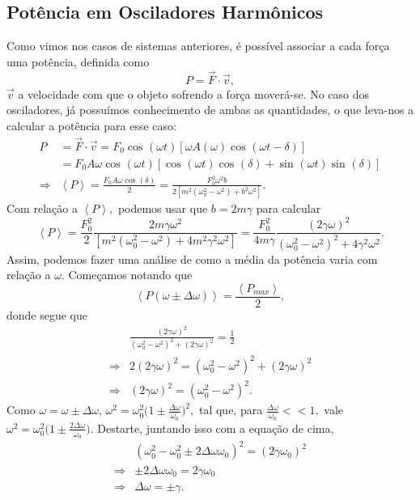 \documentclass{article}
\begin{document}
\subsection{Potência em Osciladores Harmônicos}
  Como vimos nos casos de sistemas anteriores, é possível associar a cada força uma potência, definida como 
    \[
      P = \vec{F}\cdot \vec{v},
    \]
 \(\vec{v}\) a velocidade com que o objeto sofrendo a força moverá-se. No caso dos osciladores, já possuímos conhecimento
de ambas as quantidades, o que leva-nos a calcular a potência para esse caso:
\begin{align*}
  P &= \vec{F}\cdot \vec{v} = F_{0}\cos^{}{(\omega t)}[\omega A(\omega )\cos^{}{(\omega t-\delta )}]\\
    &=F_{0}A\omega \cos^{}{(\omega t)}[\cos^{}{(\omega t)}\cos^{}{(\delta )} + \sin^{}{(\omega t)}\sin^{}{(\delta )}]\\
  \Rightarrow & \left< P\right> = \frac{F_{0}A\omega \cos^{}{(\delta )}}{2} = \frac{F_{0}^{2}\omega^{2}b}{2[m^{2}(\omega_{0}^{2}-\omega^{2})+b^{2}\omega^{2}]}.
\end{align*}
  Com relação a \(\left< P \right>,\) podemos usar que \(b = 2m\gamma \) para calcular 
    \[
      \left< P \right> = \frac{F_{0}^{2}}{2}\frac{2m\gamma \omega^{2}}{[m^{2}(\omega_{0}^{2}-\omega^{2}) + 4m^{2}\gamma^{2}\omega^{2}]} = \frac{F_{0}^{2}}{4m\gamma }\frac{(2\gamma \omega )^{2}}{(\omega_{0}^{2}-\omega ^{2})^{2}+4\gamma^{2}\omega^{2}}.
    \]
Assim, podemos fazer uma análise de como a média da potência varia com relação a \(\omega \). Começamos notando que 
  \[
    \left< P(\omega \pm \Delta \omega ) \right> = \frac{\left< P_{max} \right>}{2},
  \]
donde segue que 
\begin{align*}
  &\frac{(2\gamma \omega )^{2}}{(\omega_{0}^{2}-\omega ^{2})^{2}+(2\gamma \omega )^{2}} = \frac{1}{2}\\
  \Rightarrow &2(2\gamma \omega )^{2} = (\omega_{0}^{2}-\omega ^{2})^{2}+(2\gamma \omega )^{2}\\
  \Rightarrow &(2\gamma \omega )^{2}=(\omega_{0}^{2}-\omega ^{2})^{2}.
\end{align*}
Como \(\omega = \omega \pm \Delta \omega \), \(\omega^{2} = \omega_{0}^{2}\biggl(1\pm \frac{\Delta \omega }{\omega_{0}}\biggr)^{2},\) tal que, para \(\frac{\Delta \omega }{\omega_{0}} <<1,\)
vale \(\omega ^{2} = \omega_{0}^{2}\biggl(1 \pm \frac{2\Delta \omega }{\omega_{0}}\biggr).\) Destarte, juntando isso com a equação de cima,
 \begin{align*}
   &(\omega_{0}^{2}-\omega_{0}^{2}\pm 2\Delta \omega \omega_{0})^{2} = (2\gamma \omega_{0})^{2}\\
   \Rightarrow &\pm 2\Delta \omega \omega_{0} = 2\gamma \omega_{0}\\
   \Rightarrow &\Delta \omega = \pm\gamma .
 \end{align*}
\end{document}
